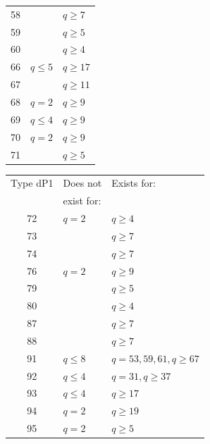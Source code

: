 \documentclass[a4paper, 11pt, reqno]{amsart}
\numberwithin{equation}{section} \numberwithin{figure}{section}
\theoremstyle{definition}
\numberwithin{lemma}{section}
\begin{document}
\begin{table}[ht]
\begin{minipage}{0.44\textwidth}
\begin{tabular}{|c|l|l|}
            58 & & $q \geq 7$\\
            59 & & $q \geq 5$\\
            60 & & $q \geq 4$\\
            \arrayrulecolor{lightgray}\hline
            \arrayrulecolor{black}
            66 & $q \leq 5$ & $q \geq 17$\\
            67 & & $q \geq 11$\\
            68 & $q = 2 $ & $q \geq 9$\\
            69 & $q \leq 4$ & $q \geq 9$\\
            70 & $q = 2 $ & $q \geq 9$\\
            71 & & $q \geq 5$\\
            \hline
        \end{tabular}
    \end{minipage}
    \begin{minipage}{0.55\textwidth}
    \centering
        \begin{tabular}{|c|l|l|}
        \hline
            Type dP1 & Does not & Exists for:\\ 
            & exist for: & \\
            \hline  
            72 & $q = 2$ & $q \geq 4$\\
            73 & & $q \geq 7$\\
            74 & & $q \geq 7$\\
            \arrayrulecolor{lightgray}\hline
            \arrayrulecolor{black}
            76 & $q = 2 $ & $q \geq 9$\\
            \arrayrulecolor{lightgray}\hline
            \arrayrulecolor{black}
            79 & & $q \geq 5$\\
            80 & & $q \geq 4$\\
            \arrayrulecolor{lightgray}\hline
            \arrayrulecolor{black}
            87 & & $q \geq 7$\\
            88 & & $q \geq 7$\\
            \arrayrulecolor{lightgray}\hline
            \arrayrulecolor{black}
            91 & $q \leq 8$ & $q = 53, 59, 61, q \geq 67$\\
            92 & $q \leq 4$ & $q = 31, q \geq 37$\\
            93 & $q \leq 4$ & $q \geq 17$\\
            94 & $q = 2 $ & $q \geq 19$\\
            95 & $q = 2 $ & $q \geq 5$\\

\end{tabular}
\end{minipage}
\end{table}
\end{document}
